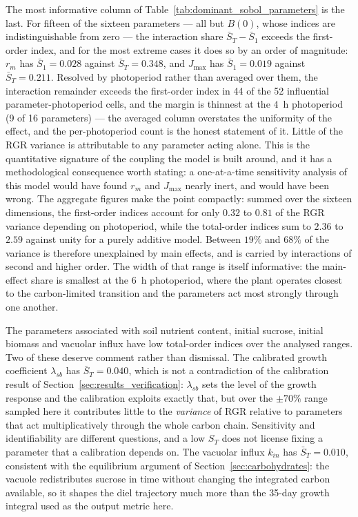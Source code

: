 \documentclass[a4paper,fleqn]{cas-sc}
\begin{document}
The most informative column of Table~\ref{tab:dominant_sobol_parameters} is
the last. For fifteen of the sixteen parameters --- all but $B(0)$, whose
indices are indistinguishable from zero --- the interaction share
$\bar S_T-\bar S_1$ exceeds the first-order index, and for the most extreme
cases it does so by an order of magnitude: $r_m$ has $\bar S_1 = 0.028$ against
$\bar S_T = 0.348$, and $J_{\max}$ has $\bar S_1 = 0.019$ against
$\bar S_T = 0.211$. Resolved by photoperiod rather than averaged over them, the
interaction remainder exceeds the first-order index in 44 of the 52 influential
parameter-photoperiod cells, and the margin is thinnest at the $4$~h photoperiod
(9 of 16 parameters) --- the averaged column overstates the uniformity of the
effect, and the per-photoperiod count is the honest statement of it. Little of
the RGR variance is attributable to any parameter acting alone. This is the quantitative signature of the coupling
the model is built around, and it has a methodological consequence worth
stating: a one-at-a-time sensitivity analysis of this model would have found
$r_m$ and $J_{\max}$ nearly inert, and would have been wrong. The
aggregate figures make the point compactly: summed over the sixteen
dimensions, the first-order indices account for only $0.32$ to $0.81$ of the
RGR variance depending on photoperiod, while the total-order indices sum to
$2.36$ to $2.59$ against unity for a purely additive model. Between $19\%$ and
$68\%$ of the variance is therefore unexplained by main effects, and is
carried by interactions of second and higher order. The width of that range is
itself informative: the main-effect share is smallest at the $6$~h photoperiod,
where the plant operates closest to the carbon-limited transition and the
parameters act most strongly through one another.

The parameters associated with soil nutrient content, initial sucrose,
initial biomass and vacuolar influx have low total-order indices over the
analysed ranges. Two of these deserve comment rather than dismissal. The
calibrated growth coefficient $\lambda_{sb}$ has $\bar S_T = 0.040$, which is
not a contradiction of the calibration result of
Section~\ref{sec:results_verification}: $\lambda_{sb}$ sets the level of the
growth response and the calibration exploits exactly that, but over the
$\pm70\%$ range sampled here it contributes little to the \emph{variance} of
RGR relative to parameters that act multiplicatively through the whole
carbon chain. Sensitivity and identifiability are different questions, and a
low $S_T$ does not license fixing a parameter that a calibration depends on.
The vacuolar influx $k_{in}$ has $\bar S_T = 0.010$, consistent with the
equilibrium argument of Section~\ref{sec:carbohydrates}: the vacuole
redistributes sucrose in time without changing the integrated carbon
available, so it shapes the diel trajectory much more than the 35-day growth
integral used as the output metric here.
\end{document}
